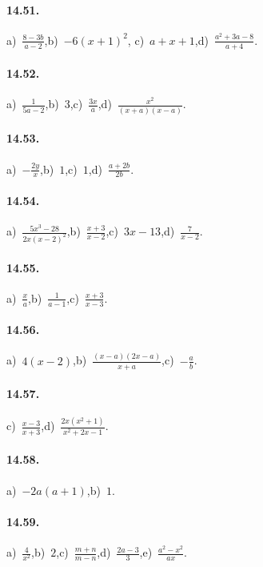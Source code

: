 \paragraph{14.51.}
a)~$\frac{8-3b}{a-2}$,\quad b)~$-6(x+1)^{2}$, \quad c)~$a+x+1$,\quad d)~$\frac{a^{2}+3a-8}{a+4}$.

\paragraph{14.52.}
a)~$\frac{1}{5a-2}$,\quad b)~$3$,\quad c)~$\frac{3x}{a}$,\quad d)~$\frac{x^{2}}{(x+a)(x-a)}$.

\paragraph{14.53.}
a)~$-\frac{2y}{x}$,\quad b)~$1$,\quad c)~$1$,\quad d)~$\frac{a+2b}{2b}$. %

\paragraph{14.54.}
a)~$\frac{5x^{3}-28}{2x(x-2)^{2}}$,\quad b)~$\frac{x+3}{x-2}$,\quad c)~$3x-13$,\quad d)~$\frac{7}{x-2}$.

\paragraph{14.55.}
a)~$\frac{x}{a}$,\quad b)~$\frac{1}{a-1}$,\quad c)~$\frac{x+3}{x-3}$.

\paragraph{14.56.}
a)~$4(x-2)$,\quad b)~$\frac{(x-a)(2x-a)}{x+a}$,\quad c)~$-\frac{a}{b}$.

\paragraph{14.57.}
c)~$\frac{x-3}{x+3}$,\quad d)~$\frac{2x\left(x^{2}+1\right)}{x^{2}+2x-1}$.

\paragraph{14.58.}
a)~$-2a(a+1)$,\quad b)~$1$.

\paragraph{14.59.}
a)~$\frac{4}{x^{2}}$,\quad b)~$2$,\quad c)~$\frac{m+n}{m-n}$,\quad d)~$\frac{2a-3}{3}$,\quad e)~$\frac{a^{2}-x^{2}}{ax}$.

